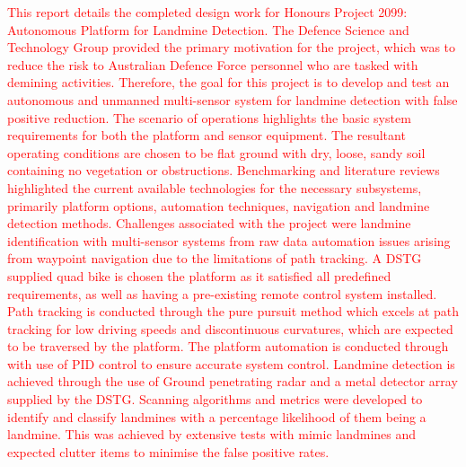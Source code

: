 \documentclass[main.tex]{subfiles}
\begin{document}
\textcolor{red}{
This report details the completed design work for Honours Project 2099: Autonomous Platform for Landmine Detection. The Defence Science and Technology Group provided the primary motivation for the project, which was to reduce the risk to Australian Defence Force personnel who are tasked with demining activities. Therefore, the goal for this project is to develop and test an autonomous and unmanned multi-sensor system for landmine detection with false positive reduction. 
The scenario of operations highlights the basic system requirements for both the platform and sensor equipment. The resultant operating conditions are chosen to be flat ground with dry, loose, sandy soil containing no vegetation or obstructions. Benchmarking and literature reviews highlighted the current available technologies for the necessary subsystems, primarily platform options, automation techniques, navigation and landmine detection methods. Challenges associated with the project were landmine identification with multi-sensor systems from raw data automation issues arising from waypoint navigation due to the limitations of path tracking.  
A DSTG supplied quad bike is chosen the platform as it satisfied all predefined requirements, as well as having a pre-existing remote control system installed.
Path tracking is conducted through the pure pursuit method which excels at path tracking for low driving speeds and discontinuous curvatures, which are expected to be traversed by the platform.
The platform automation is conducted through with use of PID control to ensure accurate system control. Landmine detection is achieved through the use of Ground penetrating radar and a metal detector array supplied by the DSTG. Scanning algorithms and metrics were developed to identify and classify landmines with a percentage likelihood of them being a landmine. This was achieved by extensive tests with mimic landmines and expected clutter items to minimise the false positive rates. 
}
\end{document}
